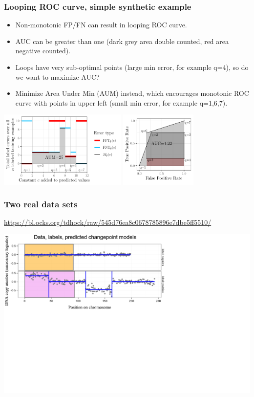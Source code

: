 \documentclass[t]{beamer}
\begin{document}
\begin{frame}
  \frametitle{Looping ROC curve, simple synthetic example}

  \begin{itemize}
  \item Non-monotonic FP/FN can result in looping ROC curve.
  \item AUC can be greater than one (dark grey area double counted,
    red area negative counted).
  \item Loops have very sub-optimal points (large min error, for
    example q=4), so do we want to maximize AUC?
  \item Minimize Area Under Min (AUM) instead, which encourages
    monotonic ROC curve with points in upper left (small min error,
    for example q=1,6,7).
  \end{itemize}
 
  \includegraphics[height=1.5in]{figure-more-than-one-more-aum-nomath}
  \includegraphics[height=1.5in]{figure-more-than-one-more-auc}

\end{frame}

\begin{frame}
  \frametitle{Two real data sets}
  {\scriptsize\url{https://bl.ocks.org/tdhock/raw/545d76ea8c0678785896e7dbe5ff5510/}}
  
  \includegraphics[width=\textwidth]{figure-aum-convexity-interactive-cropped/d4r4-1.PNG}
\end{frame}
\end{document}
